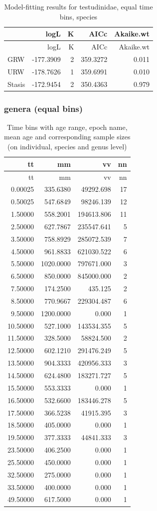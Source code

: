 \documentclass[]{article}
\begin{document}
\begin{longtable}[]{@{}lrrrr@{}}
\caption{Model-fitting results for testudinidae, equal time bins,
species}\tabularnewline
\toprule
& logL & K & AICc & Akaike.wt\tabularnewline
\midrule
\endfirsthead
\toprule
& logL & K & AICc & Akaike.wt\tabularnewline
\midrule
\endhead
GRW & -177.3909 & 2 & 359.3272 & 0.011\tabularnewline
URW & -178.7626 & 1 & 359.6991 & 0.010\tabularnewline
Stasis & -172.9454 & 2 & 350.4363 & 0.979\tabularnewline
\bottomrule
\end{longtable}

\newpage

\subsubsection{genera (equal bins)}\label{genera-equal-bins}

\begin{longtable}[]{@{}rrrr@{}}
\caption{Time bins with age range, epoch name, mean age and
corresponding sample sizes (on individual, species and genus
level)}\tabularnewline
\toprule
tt & mm & vv & nn\tabularnewline
\midrule
\endfirsthead
\toprule
tt & mm & vv & nn\tabularnewline
\midrule
\endhead
0.00025 & 335.6380 & 49292.698 & 17\tabularnewline
0.50025 & 547.6849 & 98246.139 & 12\tabularnewline
1.50000 & 558.2001 & 194613.806 & 11\tabularnewline
2.50000 & 627.7867 & 235547.641 & 5\tabularnewline
3.50000 & 758.8929 & 285072.539 & 7\tabularnewline
4.50000 & 961.8833 & 621030.522 & 6\tabularnewline
5.50000 & 1020.0000 & 797671.000 & 3\tabularnewline
6.50000 & 850.0000 & 845000.000 & 2\tabularnewline
7.50000 & 174.2500 & 435.125 & 2\tabularnewline
8.50000 & 770.9667 & 229304.487 & 6\tabularnewline
9.50000 & 1200.0000 & 0.000 & 1\tabularnewline
10.50000 & 527.1000 & 143534.355 & 5\tabularnewline
11.50000 & 328.5000 & 58824.500 & 2\tabularnewline
12.50000 & 602.1210 & 291476.249 & 5\tabularnewline
13.50000 & 904.3333 & 420956.333 & 3\tabularnewline
14.50000 & 624.4800 & 183271.727 & 5\tabularnewline
15.50000 & 553.3333 & 0.000 & 1\tabularnewline
16.50000 & 532.6600 & 183446.278 & 5\tabularnewline
17.50000 & 366.5238 & 41915.395 & 3\tabularnewline
18.50000 & 405.0000 & 0.000 & 1\tabularnewline
19.50000 & 377.3333 & 44841.333 & 3\tabularnewline
23.50000 & 406.2500 & 0.000 & 1\tabularnewline
25.50000 & 450.0000 & 0.000 & 1\tabularnewline
32.50000 & 275.0000 & 0.000 & 1\tabularnewline
33.50000 & 400.0000 & 0.000 & 1\tabularnewline
49.50000 & 617.5000 & 0.000 & 1\tabularnewline
\bottomrule
\end{longtable}
\end{document}
